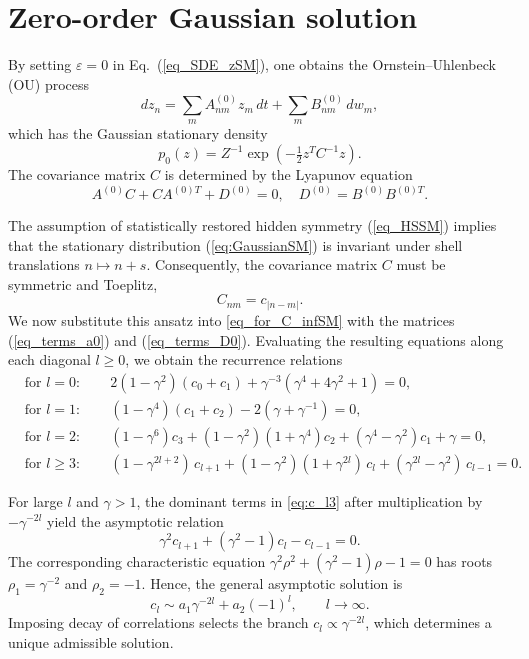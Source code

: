 \documentclass[aps,twocolumn,superscriptaddress]{revtex4-2}
\begin{document}
\section{Zero-order Gaussian solution}

By setting $\varepsilon = 0$ in Eq.~(\ref{eq_SDE_zSM}), one obtains the Ornstein--Uhlenbeck (OU) process
\begin{equation}
dz_n = \sum_m A_{nm}^{(0)} z_m\,dt + \sum_m B_{nm}^{(0)}\,dw_m,
\label{eq_OUP}
\end{equation}
which has the Gaussian stationary density
\begin{equation}
\label{eq:GaussianSM}
p_0(z)=Z^{-1}\exp\!\left(-\tfrac12 z^T C^{-1} z\right).
\end{equation}
The covariance matrix $C$ is determined by the Lyapunov equation
\begin{equation}
\label{eq_for_C_infSM}
A^{(0)}C+CA^{(0)T}+D^{(0)}=0, \quad D^{(0)}=B^{(0)}B^{(0)T}.
\end{equation}

The assumption of statistically restored hidden symmetry (\ref{eq_HSSM}) implies that the stationary distribution (\ref{eq:GaussianSM}) is invariant under shell translations \(n \mapsto n+s\). Consequently, the covariance matrix \(C\) must be symmetric and Toeplitz,
\begin{equation}
\label{eq_C_to_c}
C_{nm} = c_{|n-m|}.
\end{equation}
We now substitute this ansatz into \eqref{eq_for_C_infSM} with the matrices (\ref{eq_terms_a0}) and (\ref{eq_terms_D0}). Evaluating the resulting equations along each diagonal \(l \ge 0\), we obtain the recurrence relations
\begin{align}
&\text{for } l=0:\qquad
2(1-\gamma^2)(c_0+c_1)+\gamma^{-3}(\gamma^4+4\gamma^2+1)=0,
\label{eq:c_l0}
\\[2mm]
&\text{for } l=1:\qquad
(1-\gamma^4)(c_1+c_2)-2(\gamma+\gamma^{-1})=0,
\label{eq:c_l1}
\\[2mm]
&\text{for } l=2:\qquad
(1-\gamma^6)c_3+(1-\gamma^2)(1+\gamma^4)c_2+(\gamma^4-\gamma^2)c_1+\gamma=0,
\label{eq:c_l2}
\\[2mm]
&\text{for } l\ge 3:\qquad
(1-\gamma^{2l+2})\,c_{l+1}
+(1-\gamma^2)(1+\gamma^{2l})\,c_l
+(\gamma^{2l}-\gamma^2)\,c_{l-1}
=0.
\label{eq:c_l3}
\end{align}

For large \(l\) and \(\gamma>1\), the dominant terms in \eqref{eq:c_l3} after multiplication by $-\gamma^{-2l}$ yield the asymptotic relation
\begin{equation}
\gamma^2 c_{l+1}+(\gamma^2-1)c_l-c_{l-1}=0.
\end{equation}
The corresponding characteristic equation \(\gamma^2 \rho^2+(\gamma^2-1)\rho-1=0\) has roots \(\rho_1=\gamma^{-2}\) and \(\rho_2=-1\).
Hence, the general asymptotic solution is
\begin{equation}
c_l \sim a_1\gamma^{-2l}+a_2(-1)^l, \qquad l\to\infty.
\end{equation}
Imposing decay of correlations selects the branch \(c_l \propto\gamma^{-2l}\), which determines a unique admissible solution.
\end{document}
